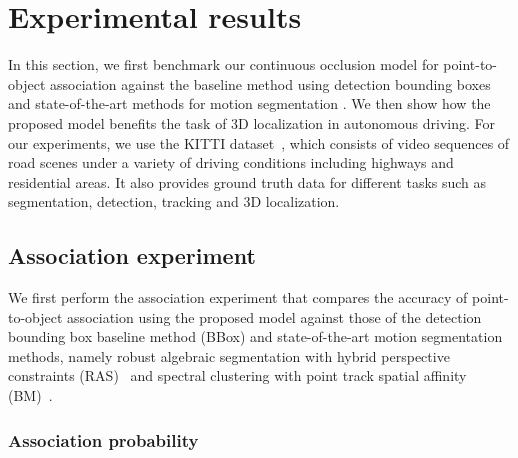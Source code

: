 \section{Experimental results}
\label{sec:experiments}

In this section, we first benchmark our continuous occlusion model for point-to-object association against the baseline method using detection bounding boxes and state-of-the-art methods for motion segmentation \cite{Rao_etal_2010,Brox_Malik_2010}. We then show how the proposed model benefits the task of 3D localization in autonomous driving. For our experiments, we use the KITTI dataset~\cite{geiger2013vision}, which consists of video sequences of road scenes under a variety of driving conditions including highways and residential areas. It also provides ground truth data for different tasks such as segmentation, detection, tracking and 3D localization.



\subsection{Association experiment}

We first perform the association experiment that compares the accuracy of point-to-object association using the proposed model against those of the detection bounding box baseline method (BBox) and state-of-the-art motion segmentation methods, namely robust algebraic segmentation with hybrid perspective constraints (RAS)~\cite{Rao_etal_2010} and spectral clustering with point track spatial affinity (BM)~\cite{Brox_Malik_2010}.


\subsubsection{Association probability}

